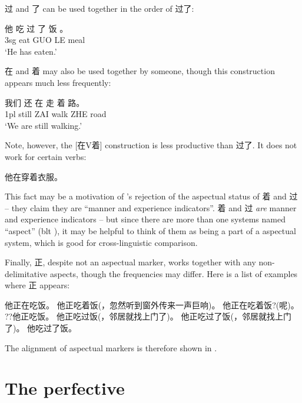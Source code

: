 过 and 了 can be used together in the order of 过了: 
\begin{exe}
    \ex \gll 他 吃 过 了 饭 。\\
    3sg eat GUO LE meal \\
    \glt `He has eaten.'
\end{exe}
在 and 着 may also be used together by someone, though this construction appears much less frequently:
\begin{exe}
    \ex \gll 我们 还 在 走 着 路。 \\
    1pl still ZAI walk ZHE road \\
    \glt `We are still walking.'
\end{exe}
Note, however, the [在V着] construction is less productive than 过了. It does not work for certain verbs:
\begin{exe}
    \ex *他在穿着衣服。
\end{exe} 

This fact may be a motivation of \citet[]{po2015chinese}'s 
rejection of the aspectual status of 着 and 过 --
they claim they are ``manner and experience indicators''.
着 and 过 \emph{are} manner and experience indicators -- 
but since there are more than one systems named ``aspect'' (\ac{blt} ), 
it may be helpful to think of them as being a part of a aspectual system, 
which is good for cross-linguistic comparison.

Finally, 正, despite not an aspectual marker, works together with any non-delimitative aspects,
though the frequencies may differ.
Here is a list of examples where 正 appears:
\begin{exe}
    \ex \begin{xlist}
        \ex 他正在吃饭。
        \ex 他正吃着饭(，忽然听到窗外传来一声巨响)。
        \ex 他正在吃着饭?(呢)。
        \ex ??他正吃饭。
        \ex 他正吃过饭(，邻居就找上门了)。
        \ex 他正吃过了饭(，邻居就找上门了)。
        \ex 他吃过了饭。
    \end{xlist}
\end{exe}

The alignment of aspectual markers is therefore shown in .

\section{The perfective }




